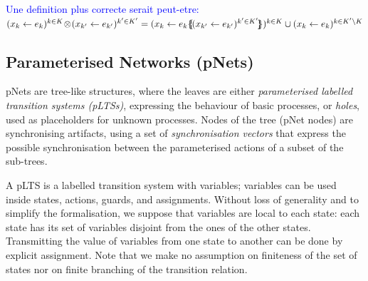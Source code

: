 \documentclass{lmcs}
\newcommand{\ERIC}[1]{\textcolor{blue}{#1}}
\newcommand{\LUDO}[1]{\textcolor{darkgreen}{#1}}
\newcommand{\shortotimes}{\!\otimes\!}
\begin{document}
\ERIC{Une definition plus correcte serait peut-etre:}\\
$(x_{k}\gets e_{k})^{k\in K}\shortotimes (x_{k'}\gets e_{k'})^{k'\in K'} =  
(x_{k}\gets e_{k}\subst{(x_{k'}\gets e_{k'})^{k'\in K'}})^{k\in K} \cup (x_k\gets e_k)^{k\in K'\backslash K}$


\subsection{Parameterised Networks (pNets)}
\label{section:pnets}

pNets are tree-like structures, where the leaves are either
\emph{parameterised labelled transition systems (pLTSs)}, expressing the
behaviour of basic processes, or \emph{holes}, used as placeholders
for unknown processes. 
Nodes of the tree (pNet nodes) are synchronising artifacts, using a
set of \emph{synchronisation vectors} that express the possible
synchronisation between the parameterised actions of a subset of the
sub-trees.



A pLTS is a labelled transition system with variables; variables can be
used inside states, actions, guards, and
assignments. Without loss of generality and to simplify the formalisation, we suppose 
 that variables are local to each 
state: each state has its set of variables disjoint from the ones of the other states. Transmitting the value of
variables from one state to another can be done by explicit assignment. 
Note that we make no assumption on finiteness of the set of states nor
on finite branching of the transition relation.
\end{document}
